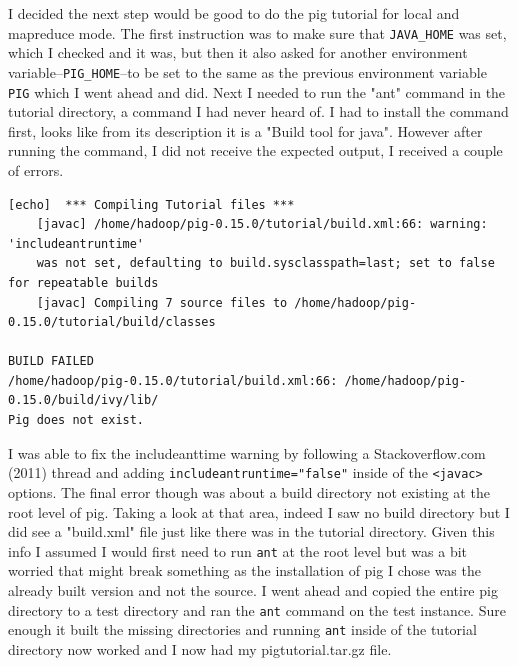 \documentclass[10pt]{article}
\begin{document}
\hfill
{}%
\par
I decided the next step would be good to do the pig tutorial for local and mapreduce mode. The first instruction was to make sure that \verb|JAVA_HOME| was set, which I checked and it was, but then it also asked for another environment variable--\verb|PIG_HOME|--to be set to the same as the previous environment variable \verb|PIG| which I went ahead and did. Next I needed to run the "ant" command in the tutorial directory, a command I had never heard of. I had to install the command first, looks like from its description it is a "Build tool for java". However after running the command, I did not receive the expected output, I received a couple of errors.
\begin{verbatim}
[echo]  *** Compiling Tutorial files ***
    [javac] /home/hadoop/pig-0.15.0/tutorial/build.xml:66: warning: 'includeantruntime' 
    was not set, defaulting to build.sysclasspath=last; set to false for repeatable builds
    [javac] Compiling 7 source files to /home/hadoop/pig-0.15.0/tutorial/build/classes

BUILD FAILED
/home/hadoop/pig-0.15.0/tutorial/build.xml:66: /home/hadoop/pig-0.15.0/build/ivy/lib/
Pig does not exist.
\end{verbatim}
I was able to fix the includeanttime warning by following a Stackoverflow.com (2011) thread and adding \verb|includeantruntime="false"| inside of the \verb|<javac>| options. The final error though was about a build directory not existing at the root level of pig. Taking a look at that area, indeed I saw no build directory but I did see a "build.xml" file just like there was in the tutorial directory. Given this info I assumed I would first need to run \verb|ant| at the root level but was a bit worried that might break something as the installation of pig I chose was the already built version and not the source. I went ahead and copied the entire pig directory to a test directory and ran the \verb|ant| command on the test instance. Sure enough it built the missing directories and running \verb|ant| inside of the tutorial directory now worked and I now had my pigtutorial.tar.gz file. 
\end{document}

